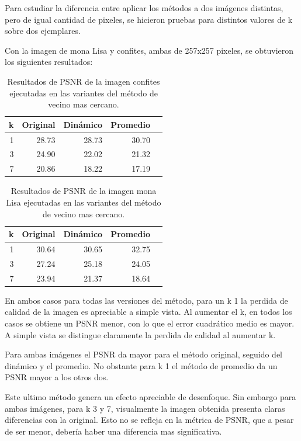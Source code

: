 \documentclass[a4paper]{article}
\newcounter{col}
\begin{document}
Para estudiar la diferencia entre aplicar los métodos a dos imágenes distintas, pero de igual cantidad de pixeles, se hicieron pruebas para distintos valores de k sobre dos ejemplares. 

Con la imagen de mona Lisa y confites, ambas de 257x257 pixeles, se obtuvieron los siguientes resultados:

\begin{table}[H]
\centering
\begin{tabular}{|r|r|r|r|r|}
\hline
\multicolumn{1}{|c|}{k} & \multicolumn{1}{c|}{Original} & \multicolumn{1}{c|}{Dinámico} & \multicolumn{1}{c|}{Promedio} \\ \hline
1 & 28.73 & 28.73& 30.70 \\ \hline
3 & 24.90 &   22.02 & 21.32 \\ \hline
7 & 20.86 &  18.22 &  17.19 \\ \hline
\end{tabular}
\caption{Resultados de PSNR de la imagen confites ejecutadas en las variantes del m\'etodo de vecino mas cercano.}
\label{}
\end{table}

\begin{table}[H]
\centering
\begin{tabular}{|r|r|r|r|r|}
\hline
\multicolumn{1}{|c|}{k} & \multicolumn{1}{c|}{Original} & \multicolumn{1}{c|}{Dinámico} & \multicolumn{1}{c|}{Promedio} \\ \hline
1 & 30.64 & 30.65& 32.75 \\ \hline
3 & 27.24 &  25.18 & 24.05 \\ \hline
7 & 23.94&  21.37 &  18.64 \\ \hline
\end{tabular}
\caption{Resultados de PSNR de la imagen mona Lisa ejecutadas en las variantes del m\'etodo de vecino mas cercano.}
\label{}
\end{table}


En ambos casos para todas las versiones del método, para un k 1 la perdida de calidad de la imagen es apreciable a simple vista. Al aumentar el k, en todos los casos se obtiene un PSNR menor, con lo que el error cuadrático medio es mayor. A simple vista se distingue claramente la perdida de calidad al aumentar k.

Para ambas imágenes el PSNR da mayor para el método original, seguido del dinámico y el promedio. No obstante para k 1 el método de promedio da un PSNR mayor a los otros dos.

Este ultimo método genera un efecto apreciable de desenfoque. Sin embargo para ambas imágenes, para k 3 y 7, visualmente la imagen obtenida presenta claras diferencias con la original. Esto no se refleja en la métrica de PSNR, que a pesar de ser menor, debería haber una diferencia mas significativa.
\end{document}
